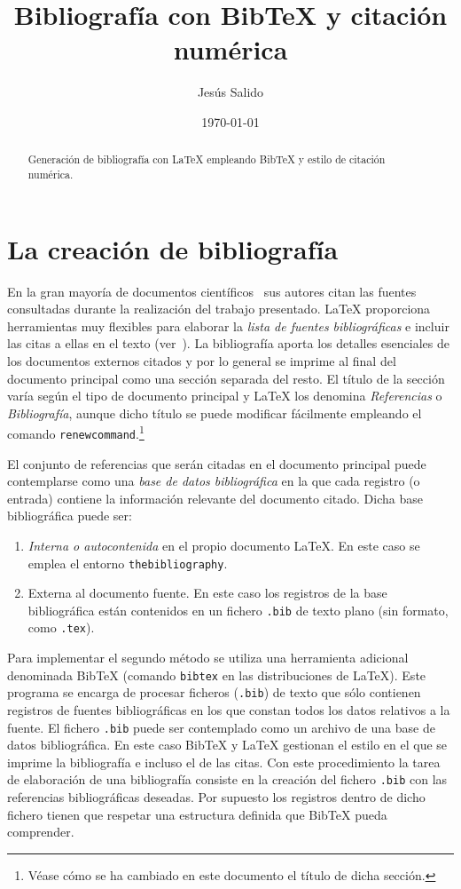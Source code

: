 \documentclass[11pt,a4paper]{article}
\author{Jesús Salido}
\title{Bibliografía con Bib\TeX{} y citación numérica}
\date{\today}
\begin{document}
\maketitle


\begin{abstract}
Generación de bibliografía con \LaTeX{} empleando Bib\TeX{} \cite{wikibookLaTex10} y estilo de citación numérica.
\end{abstract}



\section{La creación de bibliografía}
En la gran mayoría de documentos científicos~\cite[pág.~5]{salido15} sus autores citan las fuentes consultadas durante la realización del trabajo presentado. \LaTeX{} proporciona herramientas muy flexibles para elaborar la \emph{lista de fuentes bibliográficas} e incluir las citas a ellas en el texto (ver~\cite{cascales00,cascales03,goos04,kopka04,lamport94}). La bibliografía aporta los detalles esenciales de los documentos externos citados y por lo general se imprime al final del documento principal como una sección separada del resto. El título de la sección varía según el tipo de documento principal y \LaTeX{} los denomina \emph{Referencias} o \emph{Bibliografía}, aunque dicho título se puede modificar fácilmente empleando el comando \texttt{renewcommand}.\footnote{Véase cómo se ha cambiado en este documento el título de dicha sección.}


El conjunto de referencias que serán citadas en el documento principal puede contemplarse como una \emph{base de datos bibliográfica} en la que cada registro (o entrada) contiene la información relevante del documento citado. Dicha base bibliográfica puede ser:
\begin{enumerate}
	\item \emph{Interna o autocontenida} en el propio documento \LaTeX{}.
	 En este caso se emplea el entorno \texttt{thebibliography}.
	
	\item Externa al documento fuente. En este caso los registros de la base bibliográfica están contenidos en un fichero \texttt{.bib} de texto plano (sin formato, como \texttt{.tex}).
\end{enumerate}

Para implementar el segundo método se utiliza una herramienta adicional denominada Bib\TeX{} (comando \texttt{bibtex} en las distribuciones de \LaTeX). Este programa se encarga de procesar ficheros (\texttt{.bib}) de texto que sólo contienen registros de fuentes bibliográficas en los que constan todos los datos relativos a la fuente. El fichero \texttt{.bib} puede ser contemplado como un archivo de una base de datos bibliográfica. En este caso Bib\TeX{} y \LaTeX{} gestionan el estilo en el que se imprime la bibliografía e incluso el de las citas. Con este procedimiento la tarea de elaboración de una bibliografía consiste en la creación del fichero \texttt{.bib} con las referencias bibliográficas deseadas. Por supuesto los registros dentro de dicho fichero tienen que respetar una estructura definida que Bib\TeX{} pueda comprender.
\end{document}
